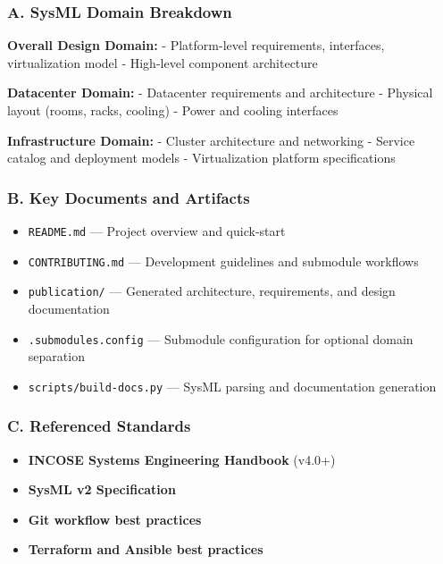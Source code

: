 \documentclass[12pt]{article}
\providecommand{\tightlist}{%
  \setlength{\itemsep}{0pt}\setlength{\parskip}{0pt}}
\begin{document}
\subsubsection{A. SysML Domain
Breakdown}\label{a.-sysml-domain-breakdown}

\textbf{Overall Design Domain:} - Platform-level requirements,
interfaces, virtualization model - High-level component architecture

\textbf{Datacenter Domain:} - Datacenter requirements and architecture -
Physical layout (rooms, racks, cooling) - Power and cooling interfaces

\textbf{Infrastructure Domain:} - Cluster architecture and networking -
Service catalog and deployment models - Virtualization platform
specifications

\subsubsection{B. Key Documents and
Artifacts}\label{b.-key-documents-and-artifacts}

\begin{itemize}
\tightlist
\item
  \texttt{README.md} --- Project overview and quick-start
\item
  \texttt{CONTRIBUTING.md} --- Development guidelines and submodule
  workflows
\item
  \texttt{publication/} --- Generated architecture, requirements, and
  design documentation
\item
  \texttt{.submodules.config} --- Submodule configuration for optional
  domain separation
\item
  \texttt{scripts/build-docs.py} --- SysML parsing and documentation
  generation
\end{itemize}

\subsubsection{C. Referenced Standards}\label{c.-referenced-standards}

\begin{itemize}
\tightlist
\item
  \textbf{INCOSE Systems Engineering Handbook} (v4.0+)
\item
  \textbf{SysML v2 Specification}
\item
  \textbf{Git workflow best practices}
\item
  \textbf{Terraform and Ansible best practices}
\end{itemize}
\end{document}
